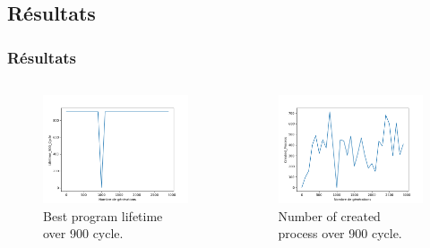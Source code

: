 \documentclass{beamer}
\begin{document}
\subsection{Résultats}
\begin{frame}
\frametitle{Résultats}
\begin{columns}[c]
    \begin{column}{.45\textwidth}
    \begin{figure}
        \centering
        \includegraphics[width=1\textwidth]{images/Lifetime_900_Cycle.png}
        \caption{Best program lifetime over 900 cycle.}
    \end{figure}    
      
    \end{column}
    \begin{column}{.45\textwidth}
    \begin{figure}
        \centering
        \includegraphics[width=1\textwidth]{images/Created_Process.png}
        \caption{Number of created process over 900 cycle.}
    \end{figure}
    \end{column}
\end{columns}

\end{frame}
\end{document}
